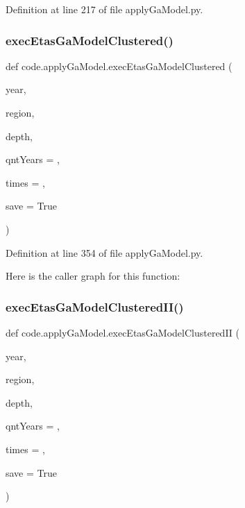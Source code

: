Definition at line 217 of file apply\+Ga\+Model.\+py.

\mbox{\label{namespacecode_1_1apply_ga_model_afb33e707c410781ea9bade622ac7a2a3}} 
\subsubsection{\texorpdfstring{exec\+Etas\+Ga\+Model\+Clustered()}{execEtasGaModelClustered()}}
{\footnotesize\ttfamily def code.\+apply\+Ga\+Model.\+exec\+Etas\+Ga\+Model\+Clustered (\begin{DoxyParamCaption}\item[{}]{year,  }\item[{}]{region,  }\item[{}]{depth,  }\item[{}]{qnt\+Years = {},  }\item[{}]{times = {},  }\item[{}]{save = {\ttfamily True} }\end{DoxyParamCaption})}



Definition at line 354 of file apply\+Ga\+Model.\+py.

Here is the caller graph for this function\+:
\mbox{\label{namespacecode_1_1apply_ga_model_adb4f83dfa0efd98ff16aa155d9393a78}} 
\subsubsection{\texorpdfstring{exec\+Etas\+Ga\+Model\+Clustered\+I\+I()}{execEtasGaModelClusteredII()}}
{\footnotesize\ttfamily def code.\+apply\+Ga\+Model.\+exec\+Etas\+Ga\+Model\+Clustered\+II (\begin{DoxyParamCaption}\item[{}]{year,  }\item[{}]{region,  }\item[{}]{depth,  }\item[{}]{qnt\+Years = {},  }\item[{}]{times = {},  }\item[{}]{save = {\ttfamily True} }\end{DoxyParamCaption})}



